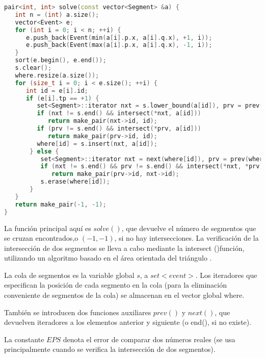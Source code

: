 \begin{lstlisting}[language=C++]
pair<int, int> solve(const vector<Segment> &a) {
   int n = (int) a.size();
   vector<Event> e;
   for (int i = 0; i < n; ++i) {
      e.push_back(Event(min(a[i].p.x, a[i].q.x), +1, i));
      e.push_back(Event(max(a[i].p.x, a[i].q.x), -1, i));
   }
   sort(e.begin(), e.end());
   s.clear();
   where.resize(a.size());
   for (size_t i = 0; i < e.size(); ++i) {
      int id = e[i].id;
      if (e[i].tp == +1) {
         set<Segment>::iterator nxt = s.lower_bound(a[id]), prv = prev(nxt);
         if (nxt != s.end() && intersect(*nxt, a[id]))
            return make_pair(nxt->id, id);
         if (prv != s.end() && intersect(*prv, a[id]))
            return make_pair(prv->id, id);
		 where[id] = s.insert(nxt, a[id]);
       } else {
          set<Segment>::iterator nxt = next(where[id]), prv = prev(where[id]);
          if (nxt != s.end() && prv != s.end() && intersect(*nxt, *prv))
             return make_pair(prv->id, nxt->id);
          s.erase(where[id]);
       }
   }
   return make_pair(-1, -1);
}
\end{lstlisting}

La función principal aquí es $solve()$, que devuelve el número de segmentos que se cruzan encontrados,o $(-1,-1)$, si no hay intersecciones. La verificación de la intersección de dos segmentos se lleva a cabo 
mediante la intersect ()función, utilizando un algoritmo basado en el área orientada del triángulo .

La cola de segmentos es la variable global $s$, a $set<event>$. Los iteradores que especifican la posición de cada segmento en la cola (para la eliminación conveniente de segmentos de la cola) se almacenan en el vector global where.

También se introducen dos funciones auxiliares $prev()$ y $next()$, que devuelven iteradores a los elementos anterior y siguiente (o end(), si no existe).

La constante $EPS$ denota el error de comparar dos números reales (se usa principalmente cuando se verifica la intersección de dos segmentos).

